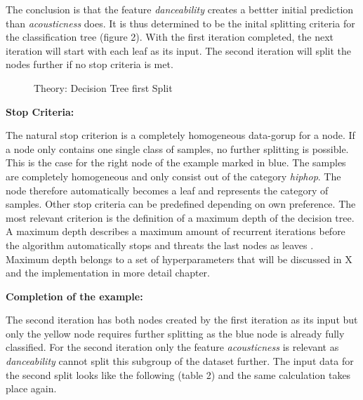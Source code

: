 The conclusion is that the feature \emph{danceability} creates a bettter initial prediction than \emph{acousticness} does. It is thus 
determined to be the inital splitting criteria for the classification tree (figure 2). With the first iteration completed, the next iteration
will start with each leaf as its input. The second iteration will split the nodes further if no stop criteria is met. 

\begin{figure}[H]
    \centering
    \qquad
    \caption{Theory: Decision Tree first Split}%
    \label{fig:theory_first_split}%
\end{figure}

\textbf{Stop Criteria:}

The natural stop criterion is a completely homogeneous data-gorup for a node. If a node only contains one single 
class of samples, no further splitting is possible. This is the case for the right node of the example marked in blue. The samples are completely
homogeneous and only consist out of the category \emph{hiphop}. The node therefore automatically becomes a leaf and represents the 
category of samples. Other stop criteria can be predefined depending on own preference. The most relevant criterion is the 
definition of a maximum depth of the decision tree. A maximum depth describes a maximum amount of recurrent iterations before 
the algorithm automatically stops and threats the last nodes as leaves \cite[p.7]{lewis2000introduction}. Maximum depth belongs to a set of hyperparameters that
will be discussed in X and the implementation in more detail chapter. 

\textbf{Completion of the example:}

The second iteration has both nodes created by the first iteration as its input but only the yellow node requires further splitting as 
the blue node is already fully classified. For the second iteration only the feature \emph{acousticness} is relevant as \emph{danceability} cannot 
split this subgroup of the dataset further. The input data for the second split looks like the following (table 2) and the same calculation 
takes place again. 

